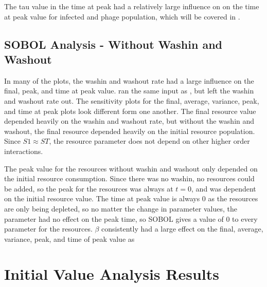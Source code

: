 The tau value in the time at peak had a relatively large influence on on the time at peak value for infected and phage population, which will be covered in . 

\subsection{SOBOL Analysis - Without Washin and Washout}
In many of the plots, the washin and washout rate had a large influence on the final, peak, and time at peak value. 
 ran the same input as , but left the washin and washout rate out. 
The sensitivity plots for the final, average, variance, peak, and time at peak plots look different form one another. 
The final resource value depended heavily on the washin and washout rate, but without the washin and washout, the final resource depended heavily on the initial resource population. 
Since $S1 \approx ST$, the resource parameter does not depend on other higher order interactions. 

The peak value for the resources without washin and washout only depended on the initial resource consumption. 
Since there was no washin, no resources could be added, so the peak for the resources was always at $t=0$, and was dependent on the initial resource value. 
The time at peak value is always 0 as the resources are only being depleted, so no matter the change in parameter values, the parameter had no effect on the peak time, so SOBOL gives a value of 0 to every parameter for the resources. 
$\beta$ consistently had a large effect on the final, average, variance, peak, and time of peak value as 


\section{Initial Value Analysis Results}
